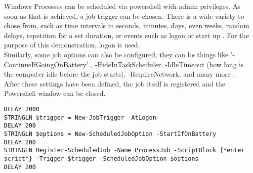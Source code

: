Windows Processes can be scheduled via powershell with admin privileges. As soon as that is achieved, a job trigger can be chosen. There is a wide variety to chose from, such as time intervals in seconds, minutes, days, even weeks, random delays, repetition for a set duration, or events such as logon or start up \cite{sdwheelerNewJobTriggerPSScheduledJobPowerShell}.
For the purpose of this demonstration, logon is used. \\
Similarly, some job options can also be configured, they can be things like '-ContinueIfGoingOnBattery' , -HideInTaskScheduler, -IdleTimeout (how long is the computer idle before the job starts), -RequireNetwork, and many more \cite{sdwheelerSetScheduledJobOptionPSScheduledJobPowerShell}. \\
After these settings have been defined, the job itself is registered and the Powershell window can be closed. \\


\begin{lstlisting}
DELAY 2000
STRINGLN $trigger = New-JobTrigger -AtLogon
DELAY 200
STRINGLN $options = New-ScheduledJobOption -StartIfOnBattery
DELAY 200
STRINGLN Register-ScheduledJob -Name ProcessJob -ScriptBlock {*enter script*} -Trigger $trigger -ScheduledJobOption $options
DELAY 200
\end{lstlisting}
